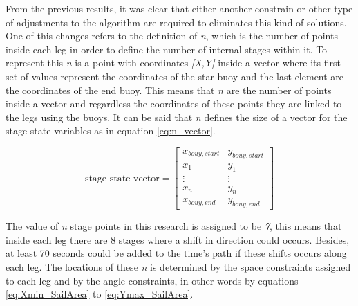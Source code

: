 From the previous results, it was clear that either another constrain or other type of adjustments to the algorithm are required to eliminates this kind of solutions. One of this changes refers to the definition of \textit{n}, which is the number of points inside each leg in order to define the number of internal stages within it. To represent this \textit{n} is a point with coordinates \textit{[X,Y]} inside a vector where its first set of values represent the coordinates of the star buoy and the last element are the coordinates of the end buoy. This means that \textit{n} are the number of points inside a vector and regardless the coordinates of these points they are linked to the legs using the buoys. It can be said that \textit{n} defines the size of a vector for the stage-state variables as in equation \ref{eq:n_vector}. \par
\begin{equation} \label{eq:n_vector}
\textrm{stage-state vector} = 
    \begin{bmatrix}
        x_{bouy,start} & y_{bouy,start} \\ 
        x_{1} & y_{1} \\
        \vdots & \vdots\\
        x_{n} & y_{n} \\
        x_{bouy,end} & y_{bouy,end} 
    \end{bmatrix}
\end{equation}

The value of \textit{n} stage points in this research is assigned to be \textit{7}, this means that inside each leg there are 8 stages where a shift in direction could occurs. Besides, at least 70 seconds could be added to the time's path if these shifts occurs along each leg. The locations of these \textit{n} is determined by the space constraints assigned to each leg and by the angle constraints, in other words by equations \ref{eq:Xmin_SailArea} to \ref{eq:Ymax_SailArea}. \par 

